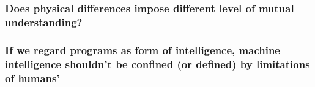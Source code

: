 \documentclass[11pt]{article}
\begin{document}
\subsubsection{Does physical differences impose different level of mutual understanding?}

\subsubsection{If we regard programs as form of intelligence, machine intelligence shouldn't be confined (or defined) by limitations of humans'}





%
%
%
\end{document}
